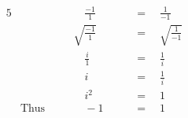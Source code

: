 \begin{alignat*}{5}
&\,&&\quad\frac{-1}{1}\quad&&\,=\quad\frac{1}{-1}\\
&\,&&\sqrt{\frac{-1}{1}}\quad&&\,=\quad\sqrt{\frac{1}{-1}}\\
&\,&&\quad\frac{i}{1}\quad&&\,=\quad\frac{1}{i}\\
&\,&&\quad i\quad&&\,=\quad\frac{1}{i}\\
&\,&&\quad i^2\quad&&\,=\quad1\\
&\text{Thus}\quad&&\quad-1\quad&&\,=\quad1
\end{alignat*}
